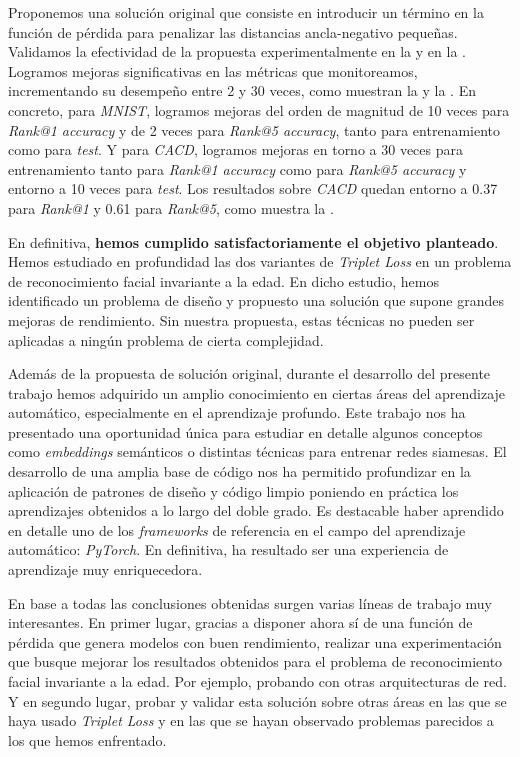 Proponemos una solución original que consiste en introducir un término en la función de pérdida para penalizar las distancias ancla-negativo pequeñas. Validamos la efectividad de la propuesta experimentalmente en la  y en la . Logramos mejoras significativas en las métricas que monitoreamos, incrementando su desempeño entre 2 y 30 veces, como muestran la  y la . En concreto, para \textit{MNIST}, logramos mejoras del orden de magnitud de 10 veces para \textit{Rank@1 accuracy} y de 2 veces para \textit{Rank@5 accuracy}, tanto para entrenamiento como para \textit{test}. Y para \textit{CACD}, logramos mejoras en torno a 30 veces para entrenamiento tanto para \textit{Rank@1 accuracy} como para \textit{Rank@5 accuracy} y entorno a 10 veces para \textit{test}. Los resultados sobre \textit{CACD} quedan entorno a 0.37 para \textit{Rank@1} y 0.61 para \textit{Rank@5}, como muestra la .

En definitiva, \textbf{hemos cumplido satisfactoriamente el objetivo planteado}. Hemos estudiado en profundidad las dos variantes de \textit{Triplet Loss} en un problema de reconocimiento facial invariante a la edad. En dicho estudio, hemos identificado un problema de diseño y propuesto una solución que supone grandes mejoras de rendimiento. Sin nuestra propuesta, estas técnicas no pueden ser aplicadas a ningún problema de cierta complejidad.

Además de la propuesta de solución original, durante el desarrollo del presente trabajo hemos adquirido un amplio conocimiento en ciertas áreas del aprendizaje automático, especialmente en el aprendizaje profundo. Este trabajo nos ha presentado una oportunidad única para estudiar en detalle algunos conceptos como \textit{embeddings} semánticos o distintas técnicas para entrenar redes siamesas. El desarrollo de una amplia base de código nos ha permitido profundizar en la aplicación de patrones de diseño y código limpio poniendo en práctica los aprendizajes obtenidos a lo largo del doble grado. Es destacable haber aprendido en detalle uno de los \textit{frameworks} de referencia en el campo del aprendizaje automático: \textit{PyTorch}. En definitiva, ha resultado ser una experiencia de aprendizaje muy enriquecedora.

En base a todas las conclusiones obtenidas surgen varias líneas de trabajo muy interesantes. En primer lugar, gracias a disponer ahora sí de una función de pérdida que genera modelos con buen rendimiento, realizar una experimentación que busque mejorar los resultados obtenidos para el problema de reconocimiento facial invariante a la edad. Por ejemplo, probando con otras arquitecturas de red. Y en segundo lugar, probar y validar esta solución sobre otras áreas en las que se haya usado \textit{Triplet Loss} y en las que se hayan observado problemas parecidos a los que hemos enfrentado.
